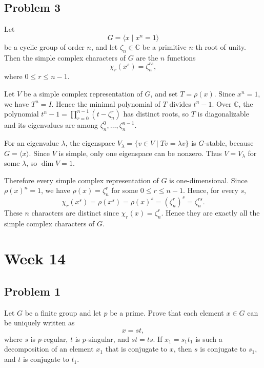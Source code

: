 \subsection*{Problem 3}

Let
\[
G=\langle x\mid x^n=1\rangle
\]
be a cyclic group of order \(n\), and let \(\zeta_n\in \mathbb{C}\) be a
primitive \(n\)-th root of unity. Then the simple complex characters of \(G\)
are the \(n\) functions
\[
\chi_r(x^s)=\zeta_n^{rs},
\]
where \(0\le r\le n-1\).
\begin{solution}
    Let \(V\) be a simple complex representation of \(G\), and set
\(T=\rho(x)\). Since \(x^n=1\), we have \(T^n=I\). Hence the minimal
polynomial of \(T\) divides \(t^n-1\). Over \(\mathbb C\), the polynomial
\(t^n-1=\prod_{r=0}^{n-1}(t-\zeta_n^r)\) has distinct roots, so \(T\) is
diagonalizable and its eigenvalues are among
\(\zeta_n^0,\dots,\zeta_n^{n-1}\).

For an eigenvalue \(\lambda\), the eigenspace
\(V_\lambda=\{v\in V\mid Tv=\lambda v\}\) is \(G\)-stable, because
\(G=\langle x\rangle\). Since \(V\) is simple, only one eigenspace can be
nonzero. Thus \(V=V_\lambda\) for some \(\lambda\), so \(\dim V=1\).

Therefore every simple complex representation of \(G\) is one-dimensional.
Since \(\rho(x)^n=1\), we have \(\rho(x)=\zeta_n^r\) for some
\(0\le r\le n-1\). Hence, for every \(s\),
\[
\chi_r(x^s)=\rho(x^s)=\rho(x)^s=(\zeta_n^r)^s=\zeta_n^{rs}.
\]
These \(n\) characters are distinct since
\(\chi_r(x)=\zeta_n^r\). Hence they are exactly all the simple complex
characters of \(G\).
\end{solution}

\section{Week 14}
\subsection*{Problem 1}
Let \(G\) be a finite group and let \(p\) be a prime. Prove that each element
\(x\in G\) can be uniquely written as
\[
x=st,
\]
where \(s\) is \(p\)-regular, \(t\) is \(p\)-singular, and \(st=ts\).
If \(x_1=s_1t_1\) is such a decomposition of an element \(x_1\) that is
conjugate to \(x\), then \(s\) is conjugate to \(s_1\), and \(t\) is conjugate
to \(t_1\).

